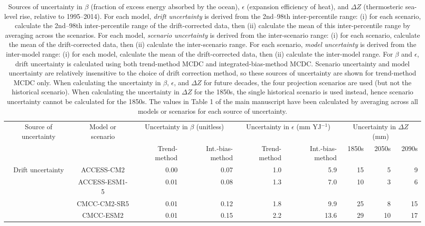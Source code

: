 \begin{table*}[t]
\centering
\caption{Sources of uncertainty in $\beta$ (fraction of excess energy absorbed by the ocean), $\epsilon$ (expansion efficiency of heat), and ${\Delta}Z$ (thermosteric sea-level rise, relative to 1995--2014). For each model, \emph{drift uncertainty} is derived from the 2nd--98th inter-percentile range: (i) for each scenario, calculate the 2nd--98th inter-percentile range of the drift-corrected data, then (ii) calculate the mean of this inter-percentile range by averaging across the scenarios. For each model, \emph{scenario uncertainty} is derived from the inter-scenario range: (i) for each scenario, calculate the mean of the drift-corrected data, then (ii) calculate the inter-scenario range. For each scenario, \emph{model uncertainty} is derived from the inter-model range: (i) for each model, calculate the mean of the drift-corrected data, then (ii) calculate the inter-model range. For $\beta$ and $\epsilon$, drift uncertainty is calculated using both trend-method MCDC and integrated-bias-method MCDC. Scenario uncertainty and model uncertainty are relatively insensitive to the choice of drift correction method, so these sources of uncertainty are shown for trend-method MCDC only. When calculating the uncertainty in $\beta$, $\epsilon$, and ${\Delta}Z$ for future decades, the four projection scenarios are used (but not the historical scenario). When calculating the uncertainty in ${\Delta}Z$ for the 1850s, the single historical scenario is used instead, hence scenario uncertainty cannot be calculated for the 1850s. The values in Table 1 of the main manuscript have been calculated by averaging across all models or scenarios for each source of uncertainty.}
\begin{tabular}{c|c|rr|rr|rrr}
\toprule
Source of uncertainty & Model or scenario & \multicolumn{2}{c|}{Uncertainty in $\beta$ (unitless)} & \multicolumn{2}{c|}{Uncertainty in $\epsilon$ (mm YJ$^{-1}$)} & \multicolumn{3}{c}{Uncertainty in ${\Delta}Z$ (mm)} \\
 &  & Trend-method & Int.-bias-method & Trend-method & Int.-bias-method & 1850s & 2050s & 2090s \\
\midrule
\multirow[c]{20}{*}{Drift uncertainty} & ACCESS-CM2 & 0.00 & 0.07 & 1.0 & 5.9 & 15 & 5 & 9 \\
 & ACCESS-ESM1-5 & 0.01 & 0.08 & 1.3 & 7.0 & 10 & 3 & 6 \\
 & CMCC-CM2-SR5 & 0.01 & 0.12 & 1.8 & 9.9 & 25 & 8 & 15 \\
 & CMCC-ESM2 & 0.01 & 0.15 & 2.2 & 13.6 & 29 & 10 & 17 \\

\end{tabular}
\end{table*}
